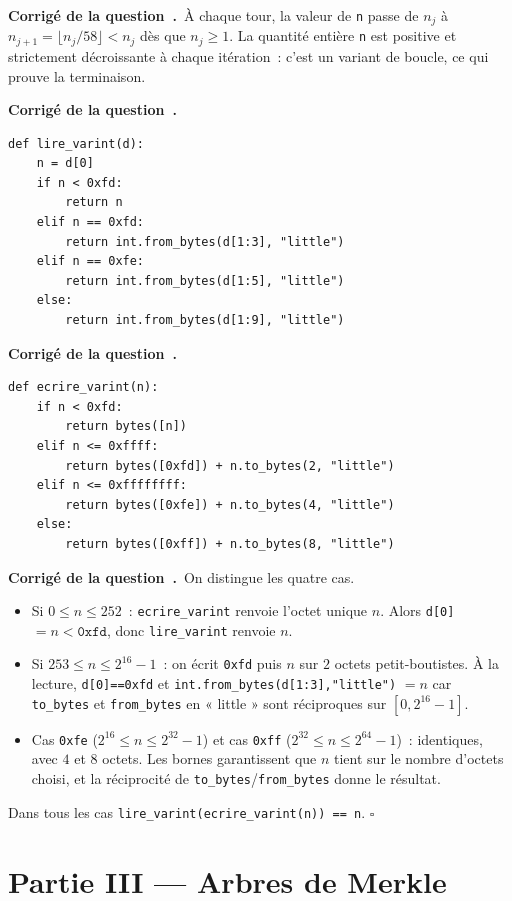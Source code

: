 \documentclass[11pt,a4paper]{article}
\newcounter{qcnt}
\newcommand{\Q}{\medskip\par\stepcounter{qcnt}\noindent\textbf{Corrigé de la question~\theqcnt.}~}
\newcommand{\code}[1]{\lstinline!#1!}
\begin{document}
\Q À chaque tour, la valeur de \code{n} passe de $n_j$ à $n_{j+1}=\lfloor n_j/58\rfloor < n_j$ dès que $n_j\ge 1$. La quantité entière \code{n} est positive et strictement décroissante à chaque itération~: c'est un variant de boucle, ce qui prouve la terminaison.

\Q
\begin{lstlisting}
def lire_varint(d):
    n = d[0]
    if n < 0xfd:
        return n
    elif n == 0xfd:
        return int.from_bytes(d[1:3], "little")
    elif n == 0xfe:
        return int.from_bytes(d[1:5], "little")
    else:
        return int.from_bytes(d[1:9], "little")
\end{lstlisting}

\Q
\begin{lstlisting}
def ecrire_varint(n):
    if n < 0xfd:
        return bytes([n])
    elif n <= 0xffff:
        return bytes([0xfd]) + n.to_bytes(2, "little")
    elif n <= 0xffffffff:
        return bytes([0xfe]) + n.to_bytes(4, "little")
    else:
        return bytes([0xff]) + n.to_bytes(8, "little")
\end{lstlisting}

\Q On distingue les quatre cas.
\begin{itemize}[nosep,leftmargin=1.4em]
  \item Si $0\le n\le 252$~: \code{ecrire_varint} renvoie l'octet unique $n$. Alors \code{d[0]} $=n<\texttt{0xfd}$, donc \code{lire_varint} renvoie $n$.
  \item Si $253\le n\le 2^{16}-1$~: on écrit \code{0xfd} puis $n$ sur $2$ octets petit-boutistes. À la lecture, \code{d[0]==0xfd} et \code{int.from_bytes(d[1:3],"little")} $=n$ car \code{to_bytes} et \code{from_bytes} en « little » sont réciproques sur $[0,2^{16}-1]$.
  \item Cas \code{0xfe} ($2^{16}\le n\le 2^{32}-1$) et cas \code{0xff} ($2^{32}\le n\le 2^{64}-1$)~: identiques, avec $4$ et $8$ octets. Les bornes garantissent que $n$ tient sur le nombre d'octets choisi, et la réciprocité de \code{to_bytes}/\code{from_bytes} donne le résultat.
\end{itemize}
Dans tous les cas \code{lire_varint(ecrire_varint(n)) == n}. \hfill$\square$

\section*{Partie III --- Arbres de Merkle}
\end{document}
